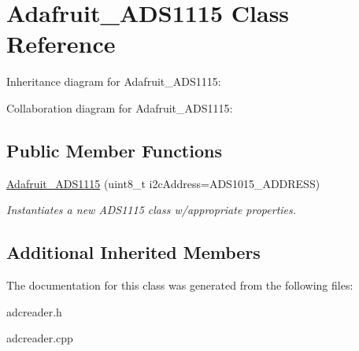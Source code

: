 \hypertarget{classAdafruit__ADS1115}{}\section{Adafruit\+\_\+\+A\+D\+S1115 Class Reference}
\label{classAdafruit__ADS1115}


Inheritance diagram for Adafruit\+\_\+\+A\+D\+S1115\+:


Collaboration diagram for Adafruit\+\_\+\+A\+D\+S1115\+:
\subsection*{Public Member Functions}
\begin{DoxyCompactItemize}
\item 
\mbox{\label{classAdafruit__ADS1115_a7058cf2c75b673fb0b0a8936c3edd1fd}} 
\hyperlink{classAdafruit__ADS1115_a7058cf2c75b673fb0b0a8936c3edd1fd}{Adafruit\+\_\+\+A\+D\+S1115} (uint8\+\_\+t i2c\+Address=A\+D\+S1015\+\_\+\+A\+D\+D\+R\+E\+SS)
\begin{DoxyCompactList}\small\item\em Instantiates a new A\+D\+S1115 class w/appropriate properties. \end{DoxyCompactList}\end{DoxyCompactItemize}
\subsection*{Additional Inherited Members}


The documentation for this class was generated from the following files\+:\begin{DoxyCompactItemize}
\item 
adcreader.\+h\item 
adcreader.\+cpp\end{DoxyCompactItemize}
